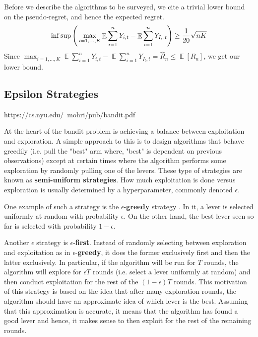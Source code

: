 \documentclass[12pt]{article}
\DeclareMathOperator*{\E}{\mathbb{E}}
\begin{document}
Before we describe the algorithms to be surveyed, we cite a trivial lower bound on the pseudo-regret, and hence the expected regret.
\begin{align}
\inf\sup\Bigg{(}\max_{i=1,...,K}\E\sum_{i=1}^{n}Y_{i,t}-\E\sum_{i=1}^{n}Y_{I_{t},t}\Bigg{)}\geq\frac{1}{20}\sqrt{nK}
\end{align}
Since $\max_{i=1,...,K}\E\sum_{i=1}^{n}Y_{i,t}-\E\sum_{i=1}^{n}Y_{I_{t},t}=\hat{R}_{n}\leq\E[R_{n}]$, we get our lower bound. 

\subsection{Epsilon Strategies}

https://cs.nyu.edu/~mohri/pub/bandit.pdf

At the heart of the bandit problem is achieving a balance between exploitation and exploration. A simple approach to this is to design algorithms that behave greedily (i.e. pull the "best" arm where, "best" is dependent on previous observations) except at certain times where the algorithm performs some exploration by randomly pulling one of the levers. These type of strategies are known as \textbf{semi-uniform strategies}. How much exploitation is done versus exploration is usually determined by a hyperparameter, commonly denoted $\epsilon$.


One example of such a strategy is the $\epsilon$-\textbf{greedy} strategy \cite{Sutton:1998:IRL:551283}. In it, a lever is selected uniformly at random with probability $\epsilon$. On the other hand, the best lever seen so far is selected with probability $1-\epsilon$. 

Another $\epsilon$ strategy is $\epsilon$-\textbf{first}. Instead of randomly selecting between exploration and exploitation as in $\epsilon$-\textbf{greedy}, it does the former exclusively first and then the latter exclusively. In particular, if the algorithm will be run for $T$ rounds, the algorithm will explore for $\epsilon T$ rounds (i.e. select a lever uniformly at random) and then conduct exploitation for the rest of the $(1-\epsilon)T$ rounds. This motivation of this strategy is based on the idea that after many exploration rounds, the algorithm should have an approximate idea of which lever is the best. Assuming that this approximation is accurate, it means that the algorithm has found a good lever and hence, it makes sense to then exploit for the rest of the remaining rounds.
\end{document}
